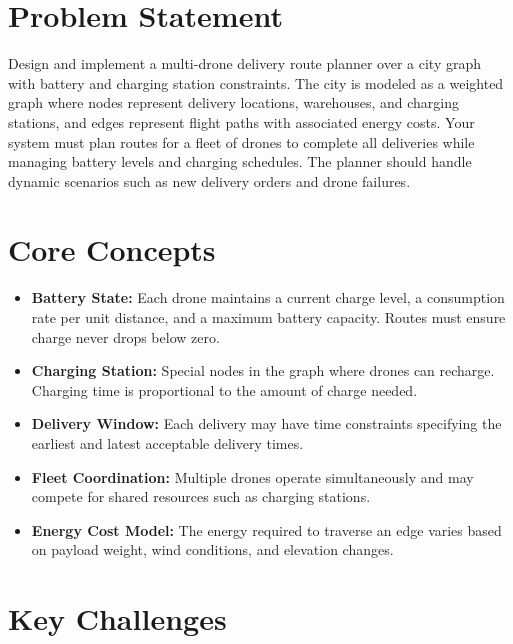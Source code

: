 \section{Problem Statement}

Design and implement a multi-drone delivery route planner over a city graph with battery and charging station constraints. The city is modeled as a weighted graph where nodes represent delivery locations, warehouses, and charging stations, and edges represent flight paths with associated energy costs. Your system must plan routes for a fleet of drones to complete all deliveries while managing battery levels and charging schedules. The planner should handle dynamic scenarios such as new delivery orders and drone failures.

\section{Core Concepts}

\begin{itemize}
  \item \textbf{Battery State:} Each drone maintains a current charge level, a consumption rate per unit distance, and a maximum battery capacity. Routes must ensure charge never drops below zero.
  \item \textbf{Charging Station:} Special nodes in the graph where drones can recharge. Charging time is proportional to the amount of charge needed.
  \item \textbf{Delivery Window:} Each delivery may have time constraints specifying the earliest and latest acceptable delivery times.
  \item \textbf{Fleet Coordination:} Multiple drones operate simultaneously and may compete for shared resources such as charging stations.
  \item \textbf{Energy Cost Model:} The energy required to traverse an edge varies based on payload weight, wind conditions, and elevation changes.
\end{itemize}

\section{Key Challenges}

